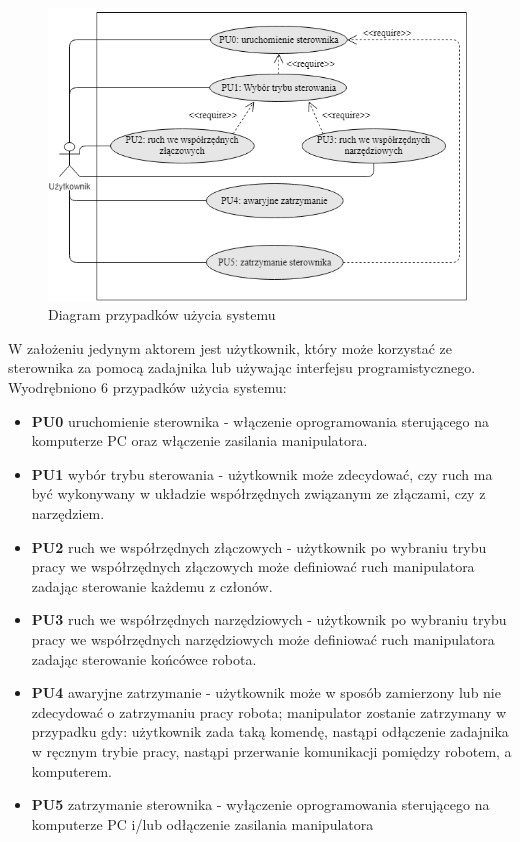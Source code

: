\documentclass[a4paper, 12pt, twoside]{article}
\begin{document}
\begin{figure}[hbt!]
\centering
\includegraphics[width=1.0\linewidth]{images/use_cases.png}
\caption{Diagram przypadków użycia systemu }
\label{fig:use_cases}
\end{figure}

W założeniu jedynym aktorem jest użytkownik, który może korzystać ze sterownika za pomocą zadajnika lub używając interfejsu programistycznego. Wyodrębniono 6 przypadków użycia systemu:

\begin{itemize}
\item \textbf{PU0} uruchomienie sterownika - włączenie oprogramowania sterującego na komputerze PC oraz włączenie zasilania manipulatora.
\item \textbf{PU1} wybór trybu sterowania - użytkownik może zdecydować, czy ruch ma być wykonywany w układzie współrzędnych związanym ze złączami, czy z narzędziem.
\item \textbf{PU2} ruch we współrzędnych złączowych - użytkownik po wybraniu trybu pracy we współrzędnych złączowych może definiować ruch manipulatora zadając sterowanie każdemu z członów.
\item \textbf{PU3} ruch we współrzędnych narzędziowych - użytkownik po wybraniu trybu pracy we współrzędnych narzędziowych może definiować ruch manipulatora zadając sterowanie końcówce robota.
\item \textbf{PU4} awaryjne zatrzymanie - użytkownik może w sposób zamierzony lub nie zdecydować o zatrzymaniu pracy robota; manipulator zostanie zatrzymany w przypadku gdy: użytkownik zada taką komendę, nastąpi odłączenie zadajnika w ręcznym trybie pracy, nastąpi przerwanie komunikacji pomiędzy robotem, a komputerem.
\item \textbf{PU5} zatrzymanie sterownika - wyłączenie oprogramowania sterującego na komputerze PC i/lub odłączenie zasilania manipulatora
\end{itemize} 
\end{document}
